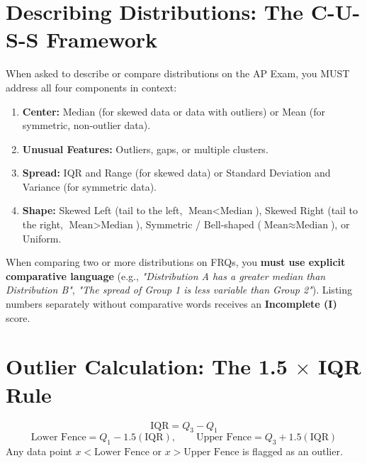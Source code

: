 \documentclass[11pt,oneside,openany]{book}
\begin{document}
\section{Describing Distributions: The C-U-S-S Framework}
When asked to describe or compare distributions on the AP Exam, you MUST address all four components in context:
\begin{enumerate}[leftmargin=1.5em]
  \item \textbf{Center:} Median (for skewed data or data with outliers) or Mean (for symmetric, non-outlier data).
  \item \textbf{Unusual Features:} Outliers, gaps, or multiple clusters.
  \item \textbf{Spread:} IQR and Range (for skewed data) or Standard Deviation and Variance (for symmetric data).
  \item \textbf{Shape:} Skewed Left (tail to the left, $\text{Mean} < \text{Median}$), Skewed Right (tail to the right, $\text{Mean} > \text{Median}$), Symmetric / Bell-shaped ($\text{Mean} \approx \text{Median}$), or Uniform.
\end{enumerate}

\begin{trapbox}
When comparing two or more distributions on FRQs, you \textbf{must use explicit comparative language} (e.g., \textit{"Distribution A has a greater median than Distribution B"}, \textit{"The spread of Group 1 is less variable than Group 2"}). Listing numbers separately without comparative words receives an \textbf{Incomplete (I)} score.
\end{trapbox}

\section{Outlier Calculation: The 1.5 $\times$ IQR Rule}
\begin{equation}
  \text{IQR} = Q_3 - Q_1
\end{equation}
\begin{equation}
  \text{Lower Fence} = Q_1 - 1.5(\text{IQR}), \qquad \text{Upper Fence} = Q_3 + 1.5(\text{IQR})
\end{equation}
Any data point $x < \text{Lower Fence}$ or $x > \text{Upper Fence}$ is flagged as an outlier.
\end{document}
